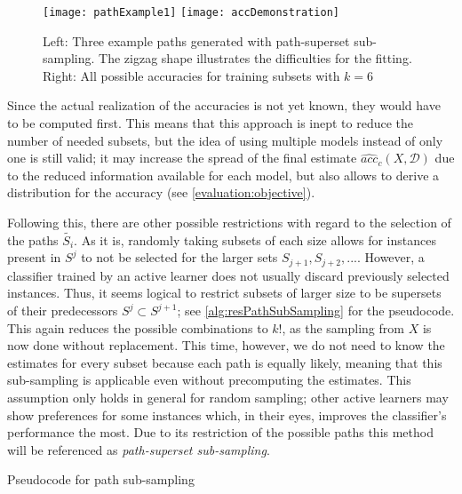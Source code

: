 \begin{figure}[h]
	\centering
	\texttt{[image: pathExample1]}
	\texttt{[image: accDemonstration]}
	\caption{Left: Three example paths generated with path-superset sub-sampling. The zigzag shape illustrates the difficulties for the fitting. Right: All possible accuracies for training subsets with $k = 6$}
	\label{fig:pathAccExamples}
\end{figure}

Since the actual realization of the accuracies is not yet known, they would have to be computed first. This means that this approach is inept to reduce the number of needed subsets, but the idea of using multiple models instead of only one is still valid; it may increase the spread of the final estimate $\widehat{acc}_c(X, \mathcal{D})$ due to the reduced information available for each model, but also allows to derive a distribution for the accuracy (see \ref{evaluation:objective}).

Following this, there are other possible restrictions with regard to the selection of the paths $\tilde{S_i}$. As it is, randomly taking subsets of each size allows for instances present in $S^j$ to not be selected for the larger sets $S_{j+1},S_{j+2},...$. However, a classifier trained by an active learner does not usually discard previously selected instances. Thus, it seems logical to restrict subsets of larger size to be supersets of their predecessors $S^j \subset S^{j+1}$; see \ref{alg:resPathSubSampling} for the pseudocode. This again reduces the possible combinations to $k!$, as the sampling from $X$ is now done without replacement. This time, however, we do not need to know the estimates for every subset because each path is equally likely, meaning that this sub-sampling is applicable even without precomputing the estimates. This assumption only holds in general for random sampling; other active learners may show preferences for some instances which, in their eyes, improves the classifier's performance the most. Due to its restriction of the possible paths this method will be referenced as \textit{path-superset sub-sampling}.

\begin{algorithm}[h]
	\begin{algorithmic}[1]
		\State {}
		\State {}
		\EndFor
		\State {}
		\EndFor
	\end{algorithmic}
	\caption{Pseudocode for path sub-sampling}
	\label{alg:unresPathSubSampling}
\end{algorithm}

